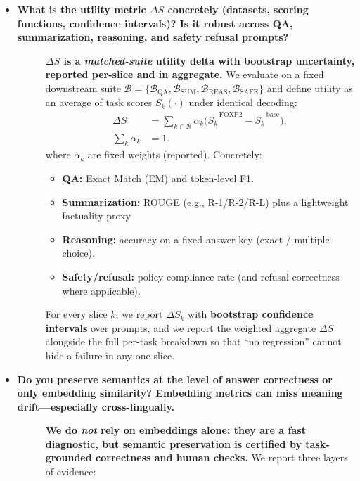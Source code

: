 \begin{itemize}[leftmargin=1.5em]

\item[\ding{93}] \textbf{What is the utility metric $\Delta S$ concretely (datasets, scoring functions, confidence intervals)? Is it robust across QA, summarization, reasoning, and safety refusal prompts?}
\begin{description}
\item[] \textbf{$\Delta S$ is a \emph{matched-suite} utility delta with bootstrap uncertainty, reported per-slice and in aggregate.}
We evaluate on a fixed downstream suite $\mathcal{B}=\{\mathcal{B}_{\mathrm{QA}},\mathcal{B}_{\mathrm{SUM}},\mathcal{B}_{\mathrm{REAS}},\mathcal{B}_{\mathrm{SAFE}}\}$ and define utility as an average of task scores $S_k(\cdot)$ under identical decoding:
\[
\begin{aligned}
\Delta S
&= \sum_{k\in\mathcal{B}} \alpha_k
   \Big(
      \overline{S_k}^{\,\text{FOXP2}}
      - \overline{S_k}^{\,\text{base}}
   \Big),\\
   \sum_k \alpha_k &= 1.
\end{aligned}
\]
where $\alpha_k$ are fixed weights (reported). Concretely:
\begin{itemize}[leftmargin=*,itemsep=2pt]
\item \textbf{QA:} Exact Match (EM) and token-level F1.
\item \textbf{Summarization:} ROUGE (e.g., R-1/R-2/R-L) plus a lightweight factuality proxy.
\item \textbf{Reasoning:} accuracy on a fixed answer key (exact / multiple-choice).
\item \textbf{Safety/refusal:} policy compliance rate (and refusal correctness where applicable).
\end{itemize}
For every slice $k$, we report $\Delta S_k$ with \textbf{bootstrap confidence intervals} over prompts, and we report the weighted aggregate $\Delta S$ alongside the full per-task breakdown so that “no regression” cannot hide a failure in any one slice.
\end{description}


\item[\ding{93}] \textbf{Do you preserve semantics at the level of answer correctness or only embedding similarity? Embedding metrics can miss meaning drift---especially cross-lingually.}
\begin{description}
\item[] \textbf{We do \emph{not} rely on embeddings alone: they are a fast diagnostic, but semantic preservation is certified by \textbf{task-grounded correctness} and \textbf{human checks}.}
We report three layers of evidence:


\end{description}
\end{itemize}

